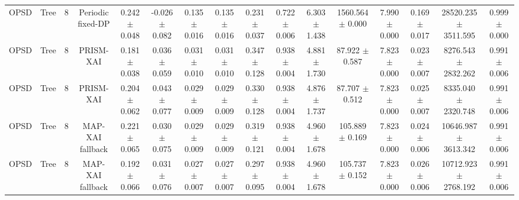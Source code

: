 \begin{tabular}{lccccccccccccccc}
OPSD & Tree & 8 & Periodic fixed-DP & 0.242 $\pm$ 0.048 & -0.026 $\pm$ 0.082 & 0.135 $\pm$ 0.016 & 0.135 $\pm$ 0.016 & 0.231 $\pm$ 0.037 & 0.722 $\pm$ 0.006 & 6.303 $\pm$ 1.438 & 1560.564 $\pm$ 0.000 & 7.990 $\pm$ 0.000 & 0.169 $\pm$ 0.017 & 28520.235 $\pm$ 3511.595 & 0.999 $\pm$ 0.000 \\
OPSD & Tree & 8 & PRISM-XAI & 0.181 $\pm$ 0.038 & 0.036 $\pm$ 0.059 & 0.031 $\pm$ 0.010 & 0.031 $\pm$ 0.010 & 0.347 $\pm$ 0.128 & 0.938 $\pm$ 0.004 & 4.881 $\pm$ 1.730 & 87.922 $\pm$ 0.587 & 7.823 $\pm$ 0.000 & 0.023 $\pm$ 0.007 & 8276.543 $\pm$ 2832.262 & 0.991 $\pm$ 0.006 \\
OPSD & Tree & 8 & PRISM-XAI & 0.204 $\pm$ 0.062 & 0.043 $\pm$ 0.077 & 0.029 $\pm$ 0.009 & 0.029 $\pm$ 0.009 & 0.330 $\pm$ 0.128 & 0.938 $\pm$ 0.004 & 4.876 $\pm$ 1.737 & 87.707 $\pm$ 0.512 & 7.823 $\pm$ 0.000 & 0.025 $\pm$ 0.007 & 8335.040 $\pm$ 2320.748 & 0.991 $\pm$ 0.006 \\
OPSD & Tree & 8 & MAP-XAI fallback & 0.221 $\pm$ 0.065 & 0.030 $\pm$ 0.075 & 0.029 $\pm$ 0.009 & 0.029 $\pm$ 0.009 & 0.319 $\pm$ 0.121 & 0.938 $\pm$ 0.004 & 4.960 $\pm$ 1.678 & 105.889 $\pm$ 0.169 & 7.823 $\pm$ 0.000 & 0.024 $\pm$ 0.006 & 10646.987 $\pm$ 3613.342 & 0.991 $\pm$ 0.006 \\
OPSD & Tree & 8 & MAP-XAI fallback & 0.192 $\pm$ 0.066 & 0.031 $\pm$ 0.076 & 0.027 $\pm$ 0.007 & 0.027 $\pm$ 0.007 & 0.297 $\pm$ 0.095 & 0.938 $\pm$ 0.004 & 4.960 $\pm$ 1.678 & 105.737 $\pm$ 0.152 & 7.823 $\pm$ 0.000 & 0.026 $\pm$ 0.006 & 10712.923 $\pm$ 2768.192 & 0.991 $\pm$ 0.006 \\
\bottomrule
\end{tabular}
